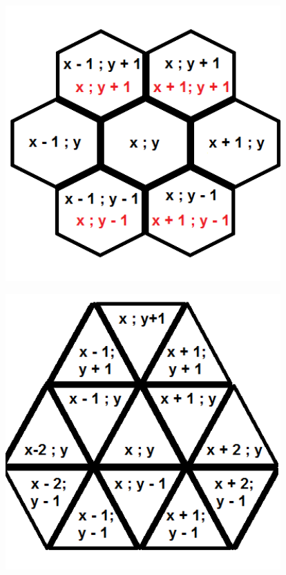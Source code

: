 \documentclass{article}
\newenvironment{Figure}
  {\par\medskip\noindent\minipage{\linewidth}}
  {\endminipage\par\medskip}
\begin{document}
\begin{multicols}{2}
\begin{Figure}
\label{fig:cartesianstd}
\end{Figure}
\begin{Figure}
 \centering
 \includegraphics[width=0.79\textwidth]{imgs/hexagonal.png}
\label{fig:hexstd}
\end{Figure}
\begin{Figure}
 \centering
 \includegraphics[width=0.79\textwidth]{imgs/triangle1.png}
\label{fig:triangle1std}
\end{Figure}
\begin{Figure}

\end{Figure}
\end{multicols}
\end{document}
